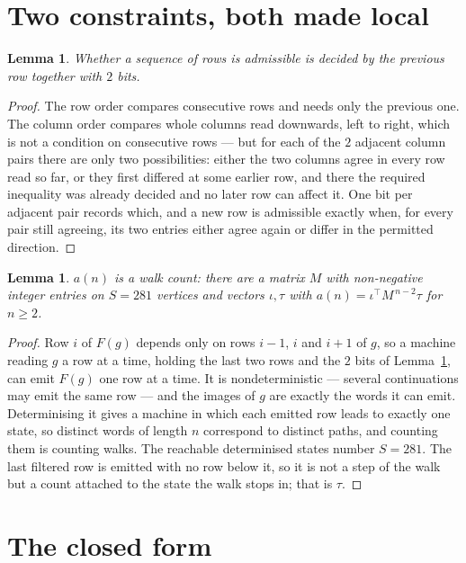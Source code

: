 \documentclass[11pt,a4paper]{article}
\theoremstyle{plain}
\newtheorem{lemma}[theorem]{Lemma}
\theoremstyle{definition}
\begin{document}
\section{Two constraints, both made local}

\begin{lemma}\label{lem:local}
Whether a sequence of rows is admissible is decided by the previous row together with
$2$ bits.
\end{lemma}

\begin{proof}
The row order compares consecutive rows and needs only the previous one. The column order
compares whole columns read downwards, left to right, which is not a condition on consecutive
rows --- but for each of the $2$ adjacent column pairs there are only two possibilities:
either the two columns agree in every row read so far, or they first differed at some earlier
row, and there the required inequality was already decided and no later row can affect it. One
bit per adjacent pair records which, and a new row is admissible exactly when, for every pair
still agreeing, its two entries either agree again or differ in the permitted direction.
\end{proof}

\begin{lemma}\label{lem:det}
$a(n)$ is a walk count: there are a matrix $M$ with non-negative integer entries on $S=281$
vertices and vectors $\iota,\tau$ with $a(n)=\iota^{\!\top}M^{\,n-2}\tau$ for $n\ge2$.
\end{lemma}

\begin{proof}
Row $i$ of $F(g)$ depends only on rows $i-1$, $i$ and $i+1$ of $g$, so a machine reading $g$ a
row at a time, holding the last two rows and the $2$ bits of Lemma~\ref{lem:local}, can
emit $F(g)$ one row at a time. It is nondeterministic --- several continuations may emit the
same row --- and the images of $g$ are exactly the words it can emit. Determinising it gives a
machine in which each emitted row leads to exactly one state, so distinct words of length $n$
correspond to distinct paths, and counting them is counting walks. The reachable determinised
states number $S=281$. The last filtered row is emitted with no row below it, so it is not a
step of the walk but a count attached to the state the walk stops in; that is $\tau$.
\end{proof}

\section{The closed form}
\end{document}
